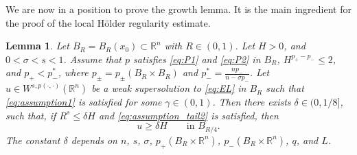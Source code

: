 \documentclass[11pt]{amsart}
\theoremstyle{plain}
\newtheorem{lemma}[theorem]{Lemma}
\theoremstyle{definition}
\numberwithin{equation}{section}
\begin{document}
We are now in a position to prove the growth lemma. 
It is the main ingredient for the proof of the local H\"older regularity estimate.
 \begin{lemma} \label{lem:growth}
Let $B_R = B_R(x_0) \subset \mathbb{R}^n$ with $R \in (0,1)$. Let $H > 0$, and $0<\sigma < s <1$. Assume that $p$ satisfies \eqref{eq:P1} and \eqref{eq:P2} in $B_R$, $H^{p_+ - p_-} \leq 2$, and $p_+ < p_-^\ast$, where $p_\pm = p_\pm(B_R \times B_R)$ and $p_-^\ast = \frac{np_-}{n-\sigma p_-}$. Let $u \in W^{s, p(\cdot,\cdot)}(\mathbb{R}^n)$ be a weak supersolution to \eqref{eq:EL} in $B_R$ such that
\eqref{eq:assumption1} is satisfied for some $\gamma\in(0,1)$. Then there exists $\delta\in(0,1/8]$, such that, if $R^s\leq \delta H$ and \eqref{eq:assumption_tail2} is satisfied, then
\begin{equation}\label{eq:lemgrowth}
 u \geq \delta H \qquad \text{in } B_{R/4}.
 \end{equation}
 The constant $\delta$ depends on $n$, $s$, $\sigma$, $p_+(B_R \times \mathbb{R}^n)$, $p_-(B_R \times \mathbb{R}^n)$, $q$, and $L$.
\end{lemma}
\end{document}
